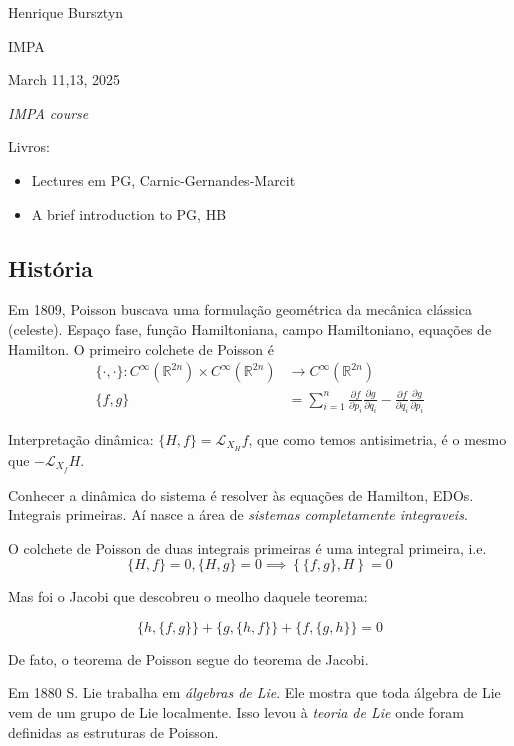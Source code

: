 \hfill{\Large Henrique Bursztyn}

{\Large \hfill IMPA}

\hfill{\large March 11,13, 2025

\hfill \textit{IMPA course}}
\vspace{2em}

\vspace{2em}
Livros:
\begin{itemize}
\item Lectures em PG, Carnic-Gernandes-Marcit
\item A brief introduction to PG, HB
\end{itemize}

\subsection{História}

Em 1809, Poisson buscava uma formulação geométrica da mecânica clássica (celeste). Espaço fase, função Hamiltoniana, campo Hamiltoniano, equações de Hamilton. O primeiro colchete de Poisson é
\begin{align*}
	\{\cdot ,\cdot \}: C^\infty(\mathbb{R}^{2n})\times C^\infty(\mathbb{R}^{2n}) &\longrightarrow C^\infty(\mathbb{R}^{2n}) \\
	\{f,g\} &=\sum_{i=1}^n \frac{\partial f}{\partial p_i}\frac{\partial g}{\partial q_i}-\frac{\partial f}{\partial q_i}\frac{\partial g}{\partial p_i}
\end{align*}

Interpretação dinâmica: \(\{H,f\}=\mathcal{L}_{X_H}f\), que como temos antisimetria, é o mesmo que \(-\mathcal{L}_{X_f}H\).

Conhecer a dinâmica do sistema é resolver às equações de Hamilton, EDOs. Integrais primeiras. Aí nasce a área de \textit{sistemas completamente integraveis}.

\begin{thm}[de Poisson, 1809]\leavevmode
O colchete de Poisson de duas integrais primeiras é uma integral primeira, i.e.
\[\{H,f\}=0,\{H,g\}=0 \implies \left\{ \{f,g\},H \right\} =0\]
\end{thm}

Mas foi o Jacobi que descobreu o meolho daquele teorema:
\begin{thm}[Jacobi, 1842]\leavevmode
\[\{h,\{f,g\}\} +\{g,\{h,f\}\} +\{f,\{g,h\}\} =0\]
\end{thm}
De fato, o teorema de Poisson segue do teorema de Jacobi.

Em 1880 S. Lie trabalha em \textit{álgebras de Lie}. Ele mostra que toda álgebra de Lie vem de um grupo de Lie localmente. Isso levou à \textit{teoria de Lie} onde foram definidas as estruturas de Poisson.

